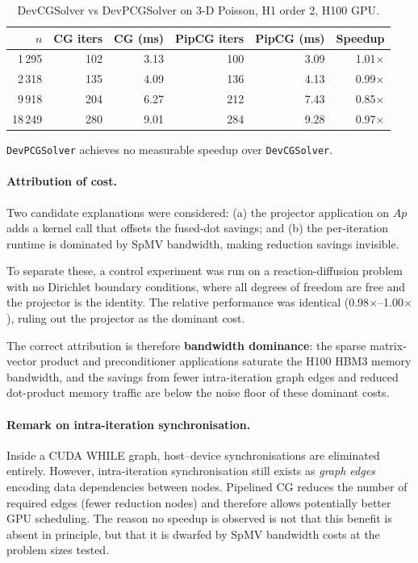\begin{table}[h]
\centering
\begin{tabular}{rrrrrr}
\hline
$n$ & CG iters & CG (ms) & PipCG iters & PipCG (ms) & Speedup \\
\hline
 1\,295 & 102 & 3.13 & 100 & 3.09 & 1.01$\times$ \\
 2\,318 & 135 & 4.09 & 136 & 4.13 & 0.99$\times$ \\
 9\,918 & 204 & 6.27 & 212 & 7.43 & 0.85$\times$ \\
18\,249 & 280 & 9.01 & 284 & 9.28 & 0.97$\times$ \\
\hline
\end{tabular}
\caption{DevCGSolver vs DevPCGSolver on 3-D Poisson, H1 order 2, H100 GPU.}
\label{tab:pipcg}
\end{table}

\texttt{DevPCGSolver} achieves no measurable speedup over \texttt{DevCGSolver}.

\paragraph{Attribution of cost.}
Two candidate explanations were considered:
(a) the projector application on $Ap$ adds a kernel call that offsets the
fused-dot savings; and
(b) the per-iteration runtime is dominated by SpMV bandwidth, making
reduction savings invisible.

To separate these, a control experiment was run on a reaction-diffusion
problem with no Dirichlet boundary conditions, where all degrees of freedom
are free and the projector is the identity.  The relative performance was
identical (0.98$\times$--1.00$\times$), ruling out the projector as the
dominant cost.

The correct attribution is therefore \textbf{bandwidth dominance}:
the sparse matrix-vector product and preconditioner applications saturate
the H100 HBM3 memory bandwidth, and the savings from fewer intra-iteration
graph edges and reduced dot-product memory traffic are below the noise floor
of these dominant costs.

\paragraph{Remark on intra-iteration synchronisation.}
Inside a CUDA WHILE graph, host--device synchronisations are eliminated
entirely.  However, intra-iteration synchronisation still exists as
\emph{graph edges} encoding data dependencies between nodes.
Pipelined CG reduces the number of required edges (fewer reduction nodes)
and therefore allows potentially better GPU scheduling.
The reason no speedup is observed is not that this benefit is absent in
principle, but that it is dwarfed by SpMV bandwidth costs at the problem
sizes tested.

